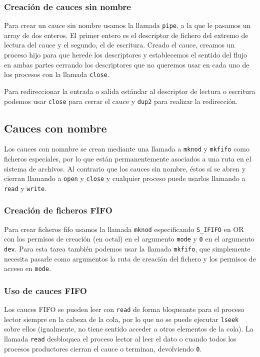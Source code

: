 \subsubsection{Creación de cauces sin nombre}

Para crear un cauce sin nombre usamos la llamada \texttt{pipe}, a la que le pasamos un array de dos enteros.
El primer entero es el descriptor de fichero del extremo de lectura del cauce y el segundo, el de escritura.
Creado el cauce, creamos un proceso hijo para que herede los descriptores y establecemos el sentido del flujo en ambas partes cerrando los descriptores que no queremos usar en cada uno de los procesos con la llamada \texttt{close}.

Para redireccionar la entrada o salida estándar al descriptor de lectura o escritura podemos usar \texttt{close} para cerrar el cauce y \texttt{dup2} para realizar la redirección.

\subsection{Cauces con nombre}

Los cauces con nomnbre se crean mediante una llamada a \texttt{mknod} y \texttt{mkfifo} como ficheros especiales, por lo que están permanentemente asociados a una ruta en el sistema de archivos.
Al contrario que los cauces sin nombre, éstos sí se abren y cierran llamando a \texttt{open} y \texttt{close} y cualquier proceso puede usarlos llamando a \texttt{read} y \texttt{write}.

\subsubsection{Creación de ficheros FIFO}

Para crear ficheros fifo usamos la llamada \texttt{mknod} especificando \texttt{S\_IFIFO} en OR con los permisos de creación (en octal) en el argumento \texttt{mode} y \texttt{0} en el argumento \texttt{dev}.
Para esta tarea también podemos usar la llamada \texttt{mkfifo}, que simplemente necesita pasarle como argumentos la ruta de creación del fichero y los permisos de acceso en \texttt{mode}.

\subsubsection{Uso de cauces FIFO}

Los cauces FIFO se pueden leer con \texttt{read} de forma bloqueante para el proceso lector siempre en la cabeza de la cola, por lo que no se puede ejecutar \texttt{lseek} sobre ellos (igualmente, no tiene sentido acceder a otros elementos de la cola).
La llamada \texttt{read} desbloquea el proceso lector al leer el dato o cuando todos los procesos productores cierran el cauce o terminan, devolviendo \texttt{0}.
